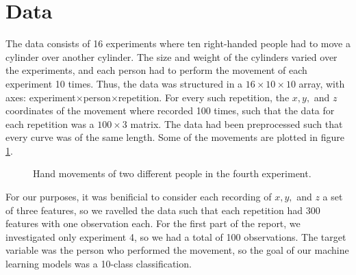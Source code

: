 \documentclass[11pt,fleqn]{article}
\begin{document}
\section{Data}
The data consists of 16 experiments where ten right-handed people had to move a cylinder over another cylinder.
The size and weight of the cylinders varied over the experiments, and each person had to perform the movement of each experiment 10 times.
Thus, the data was structured in a $ 16\times 10\times 10 $ array, with axes: experiment\(\times\)person\(\times\)repetition.
For every such repetition, the $ x, y, $ and $ z $ coordinates of the movement where recorded 100 times, such that the data for each repetition was a $ 100\times 3 $ matrix.
The data had been preprocessed such that every curve was of the same length.
Some of the movements are plotted in figure \ref{fig:trajects}.
\begin{figure}[H]
	\centering
	\label{fig:trajects}
	\caption{Hand movements of two different people in the fourth experiment.}
\end{figure}

\noindent 
For our purposes, it was benificial to consider each recording of $ x, y, $ and $ z $ a set of three features, so we ravelled the data such that each repetition had $ 300 $ features with one observation each.
For the first part of the report, we investigated only experiment 4, so we had a total of 100 observations.
The target variable was the person who performed the movement, so the goal of our machine learning models was a 10-class classification.
\end{document}
